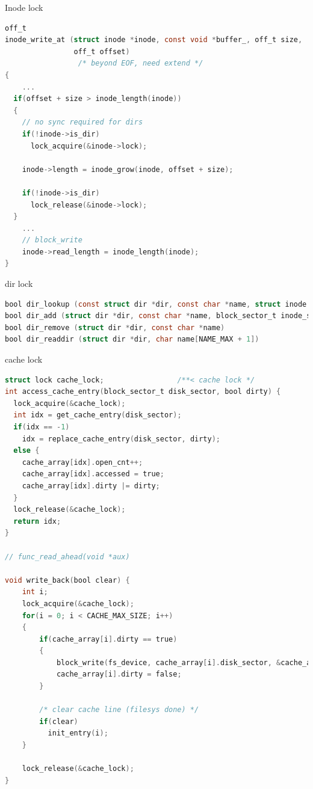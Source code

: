 \documentclass[10pt]{beamer}
\begin{document}
\begin{frame}[fragile]{Inode lock}
\begin{lstlisting}[language=C]
off_t
inode_write_at (struct inode *inode, const void *buffer_, off_t size,
                off_t offset) 
                 /* beyond EOF, need extend */
{
    ...
  if(offset + size > inode_length(inode))
  {
    // no sync required for dirs
    if(!inode->is_dir)
      lock_acquire(&inode->lock);

    inode->length = inode_grow(inode, offset + size);

    if(!inode->is_dir)
      lock_release(&inode->lock);
  }
    ...
    // block_write  
    inode->read_length = inode_length(inode);
}
\end{lstlisting}
\end{frame}
\begin{frame}[fragile]{dir lock}
\begin{lstlisting}[language=C]
bool dir_lookup (const struct dir *dir, const char *name, struct inode **inode) 
bool dir_add (struct dir *dir, const char *name, block_sector_t inode_sector)
bool dir_remove (struct dir *dir, const char *name) 
bool dir_readdir (struct dir *dir, char name[NAME_MAX + 1])
\end{lstlisting}
\end{frame}
\begin{frame}[fragile]{cache lock}
\begin{lstlisting}[language=C]
struct lock cache_lock;                 /**< cache lock */
int access_cache_entry(block_sector_t disk_sector, bool dirty) {
  lock_acquire(&cache_lock);
  int idx = get_cache_entry(disk_sector);
  if(idx == -1)
    idx = replace_cache_entry(disk_sector, dirty);
  else {
    cache_array[idx].open_cnt++;
    cache_array[idx].accessed = true;
    cache_array[idx].dirty |= dirty;
  }
  lock_release(&cache_lock);
  return idx;
}

// func_read_ahead(void *aux)

void write_back(bool clear) {
    int i;
    lock_acquire(&cache_lock);
    for(i = 0; i < CACHE_MAX_SIZE; i++)
    {
        if(cache_array[i].dirty == true)
        {
            block_write(fs_device, cache_array[i].disk_sector, &cache_array[i].block);
            cache_array[i].dirty = false;
        }

        /* clear cache line (filesys done) */
        if(clear) 
          init_entry(i);
    }

    lock_release(&cache_lock);
}
\end{lstlisting}
\end{frame}
\end{document}
